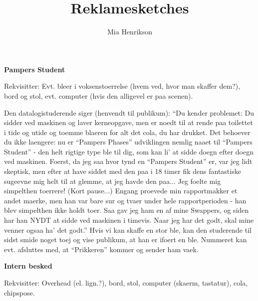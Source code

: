 \documentclass[a4paper,11pt]{article}
\title{Reklamesketches}
\author{Mia Henrikson}
\begin{document}
\maketitle




\begin{center}
{\bf Pampers Student}
\end{center}

\begin{roles}
\end{roles}

Rekvisitter: Evt. bleer i voksenstoerrelse (hvem ved, hvor man 
              skaffer dem?), bord og stol, evt. computer (hvis 
              den alligevel er paa scenen).

\begin{sketch}
Den datalogistuderende siger (henvendt til publikum): 
``Du kender problemet: Du sidder ved maskinen og laver
kerneopgave, men er noedt til at rende paa toilettet i tide og
utide og toemme blaeren for alt det cola, du har drukket. Det
behoever du ikke laengere: nu er ``Pampers Phases'' udviklingen
nemlig naaet til ``Pampers Student'' - den helt rigtige type ble
til dig, som kan li' at sidde doegn efter doegn ved maskinen.
Foerst, da jeg saa hvor tynd en ``Pampers Student'' er, var jeg
lidt skeptisk, men efter at have siddet med den paa i 18 timer
fik dens fantastiske sugeevne mig helt til at glemme, at jeg
havde den paa... Jeg foelte mig simpelthen toerrere! 
(Kort pause...) Engang proevede min rapportmakker et andet
maerke, men han var bare sur og tvaer under hele
rapportperioden - han blev simpelthen ikke holdt toer. Saa gav
jeg ham en af mine Swappers, og siden har han NYDT at sidde
ved maskinen i timevis. Naar jeg har det godt, skal mine
venner ogsaa ha' det godt.''
Hvis vi kan skaffe en stor ble, kan den studerende til sidst
smide noget toej og vise publikum, at han er ifoert en ble.
Nummeret kan evt. afsluttes med, at ``Prikkeren'' kommer og
sender ham vaek.
\end{sketch}

\newpage
\begin{center}
{\bf Intern besked}
\end{center}

\begin{roles}
\end{roles}

Rekvisitter: Overhead (el. lign.?), bord, stol, computer       
             (skaerm, tastatur), cola, chipspose.
\end{document}
